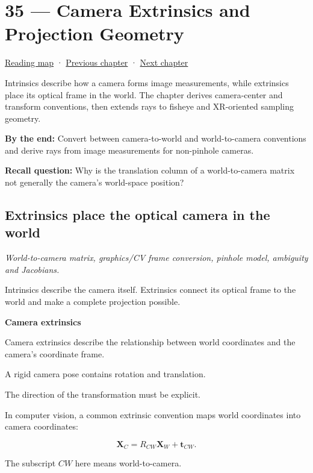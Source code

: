 \hypertarget{02-foundations-ii-ch035}{}
\chapter{35 --- Camera Extrinsics and Projection Geometry}\label{02-foundations-ii-ch035-camera-extrinsics-and-projection-geometry}

\hyperref[volume-reading-map]{Reading map} · \hyperref[02-foundations-ii-ch034-robust-predicates-and-camera-sensitivity]{Previous chapter} · \hyperref[02-foundations-ii-ch036-exposure-physical-optics-and-depth-of-field]{Next chapter}

Intrinsics describe how a camera forms image measurements, while extrinsics place its optical frame in the world. The chapter derives camera-center and transform conventions, then extends rays to fisheye and XR-oriented sampling geometry.

\textbf{By the end:} Convert between camera-to-world and world-to-camera conventions and derive rays from image measurements for non-pinhole cameras.

\textbf{Recall question:} Why is the translation column of a world-to-camera matrix not generally the camera's world-space position?

\section{Extrinsics place the optical camera in the world}\label{02-foundations-ii-ch035-extrinsics-place-the-optical-camera-in-the-world}

\emph{World-to-camera matrix, graphics/CV frame conversion, pinhole model, ambiguity and Jacobians.}

Intrinsics describe the camera itself. Extrinsics connect its optical frame to the world and make a complete projection possible.

\textbf{Camera extrinsics}

Camera extrinsics describe the relationship between world coordinates and the camera's coordinate frame.

A rigid camera pose contains rotation and translation.

The direction of the transformation must be explicit.

In computer vision, a common extrinsic convention maps world coordinates into camera coordinates:

\[
 \boxed{ \mathbf X_C=R_{CW}\mathbf X_W+\mathbf t_{CW} }.
\]

The subscript \(CW\) here means world-to-camera.

